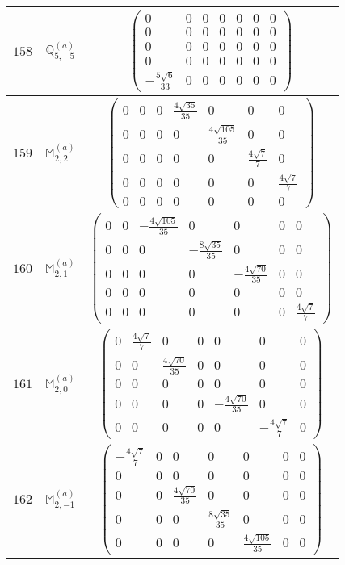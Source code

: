 \documentclass[fleqn,8pt,landscape]{jsarticle}
\begin{document}
\begin{center}
\begin{longtable}{ccc}
$ 158 $ & $ \mathbb{Q}_{5,-5}^{(a)} $ & $ \begin{pmatrix} 0 & 0 & 0 & 0 & 0 & 0 & 0 \\ 0 & 0 & 0 & 0 & 0 & 0 & 0 \\ 0 & 0 & 0 & 0 & 0 & 0 & 0 \\ 0 & 0 & 0 & 0 & 0 & 0 & 0 \\ - \frac{5 \sqrt{6}}{33} & 0 & 0 & 0 & 0 & 0 & 0 \end{pmatrix} $ \\ \hline
$ 159 $ & $ \mathbb{M}_{2,2}^{(a)} $ & $ \begin{pmatrix} 0 & 0 & 0 & \frac{4 \sqrt{35}}{35} & 0 & 0 & 0 \\ 0 & 0 & 0 & 0 & \frac{4 \sqrt{105}}{35} & 0 & 0 \\ 0 & 0 & 0 & 0 & 0 & \frac{4 \sqrt{7}}{7} & 0 \\ 0 & 0 & 0 & 0 & 0 & 0 & \frac{4 \sqrt{7}}{7} \\ 0 & 0 & 0 & 0 & 0 & 0 & 0 \end{pmatrix} $ \\ \hline
$ 160 $ & $ \mathbb{M}_{2,1}^{(a)} $ & $ \begin{pmatrix} 0 & 0 & - \frac{4 \sqrt{105}}{35} & 0 & 0 & 0 & 0 \\ 0 & 0 & 0 & - \frac{8 \sqrt{35}}{35} & 0 & 0 & 0 \\ 0 & 0 & 0 & 0 & - \frac{4 \sqrt{70}}{35} & 0 & 0 \\ 0 & 0 & 0 & 0 & 0 & 0 & 0 \\ 0 & 0 & 0 & 0 & 0 & 0 & \frac{4 \sqrt{7}}{7} \end{pmatrix} $ \\ \hline
$ 161 $ & $ \mathbb{M}_{2,0}^{(a)} $ & $ \begin{pmatrix} 0 & \frac{4 \sqrt{7}}{7} & 0 & 0 & 0 & 0 & 0 \\ 0 & 0 & \frac{4 \sqrt{70}}{35} & 0 & 0 & 0 & 0 \\ 0 & 0 & 0 & 0 & 0 & 0 & 0 \\ 0 & 0 & 0 & 0 & - \frac{4 \sqrt{70}}{35} & 0 & 0 \\ 0 & 0 & 0 & 0 & 0 & - \frac{4 \sqrt{7}}{7} & 0 \end{pmatrix} $ \\ \hline
$ 162 $ & $ \mathbb{M}_{2,-1}^{(a)} $ & $ \begin{pmatrix} - \frac{4 \sqrt{7}}{7} & 0 & 0 & 0 & 0 & 0 & 0 \\ 0 & 0 & 0 & 0 & 0 & 0 & 0 \\ 0 & 0 & \frac{4 \sqrt{70}}{35} & 0 & 0 & 0 & 0 \\ 0 & 0 & 0 & \frac{8 \sqrt{35}}{35} & 0 & 0 & 0 \\ 0 & 0 & 0 & 0 & \frac{4 \sqrt{105}}{35} & 0 & 0 \end{pmatrix} $ \\ \hline

\end{longtable}
\end{center}
\end{document}
